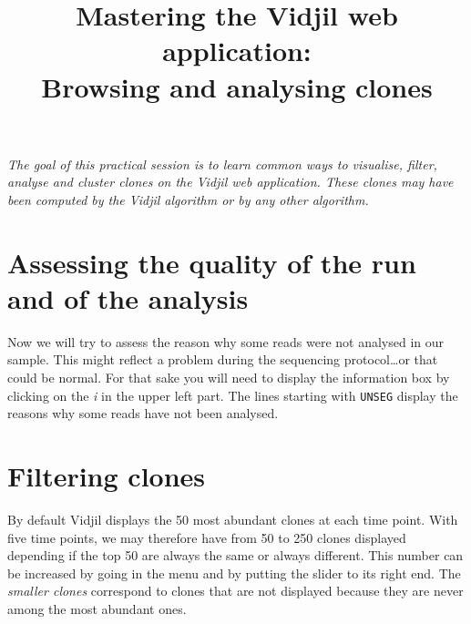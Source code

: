 \documentclass[11pt]{article}
\title{Mastering the Vidjil web application:\\ Browsing and analysing clones}
\begin{document}
\maketitle

\textit{The goal of this practical session is to learn
common ways to visualise, filter, analyse and cluster clones
on the Vidjil web application.
%
These clones may have been computed by the Vidjil algorithm or by any other algorithm.}

\bigskip


\section{Assessing the quality of the run and of the analysis}



Now we will try to assess the reason why some reads were not analysed in our
sample.
This might reflect a problem during the sequencing protocol\dots or that could
be normal.
For that sake you will need to display the information box by clicking on the
\textit{i} in the upper left part.
The lines starting with \texttt{UNSEG} display the reasons why some reads have
not been analysed.

\section{Filtering clones}


By default Vidjil displays the 50 most abundant clones at each time point.
With five time points, we may therefore have from 50 to 250 clones displayed
depending if the top 50 are always the same or always different.
This number can be increased by going in the  menu and by putting the
slider to its right end.
The \textit{smaller clones} correspond to clones that are not displayed
because they are never among the most abundant ones.
\end{document}
